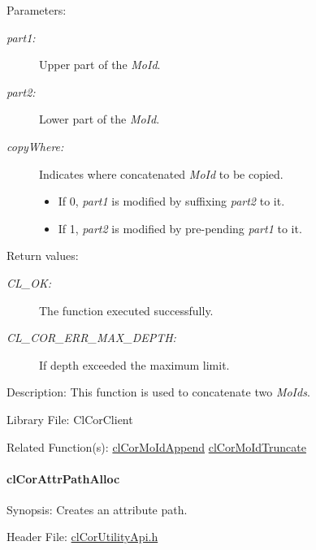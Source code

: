 \begin{Desc}
\item[Parameters:]
\begin{description}
\item[{\em part1:}]Upper part of the {\em Mo\-Id\/}. \item[{\em part2:}]Lower part of the {\em Mo\-Id\/}. \item[{\em copy\-Where:}]Indicates where concatenated {\em Mo\-Id\/} to be copied. \begin{itemize}
\item If 0, {\em part1\/} is modified by suffixing {\em part2\/} to it. \item If 1, {\em part2\/} is modified by pre-pending {\em part1\/} to it.\end{itemize}
\end{description}
\end{Desc}
\begin{Desc}
\item[Return values:]
\begin{description}
\item[{\em CL\_\-OK:}]The function executed successfully. \item[{\em CL\_\-COR\_\-ERR\_\-MAX\_\-DEPTH:}]If depth exceeded the maximum limit.\end{description}
\end{Desc}
\begin{Desc}
\item[Description:]This function is used to concatenate two {\em Mo\-Ids\/}.\end{Desc}
\begin{Desc}
\item[Library File:]Cl\-Cor\-Client\end{Desc}
\begin{Desc}
\item[Related Function(s):]\hyperlink{group__group13}{cl\-Cor\-Mo\-Id\-Append} \hyperlink{group__group13}{cl\-Cor\-Mo\-Id\-Truncate} \end{Desc}
\hypertarget{pagecor255}{}\paragraph{cl\-Cor\-Attr\-Path\-Alloc}\label{pagecor255}
\begin{Desc}
\item[Synopsis:]Creates an attribute path.\end{Desc}
\begin{Desc}
\item[Header File:]\hyperlink{cl_cor_utility_api_8h}{cl\-Cor\-Utility\-Api.h}\end{Desc}
